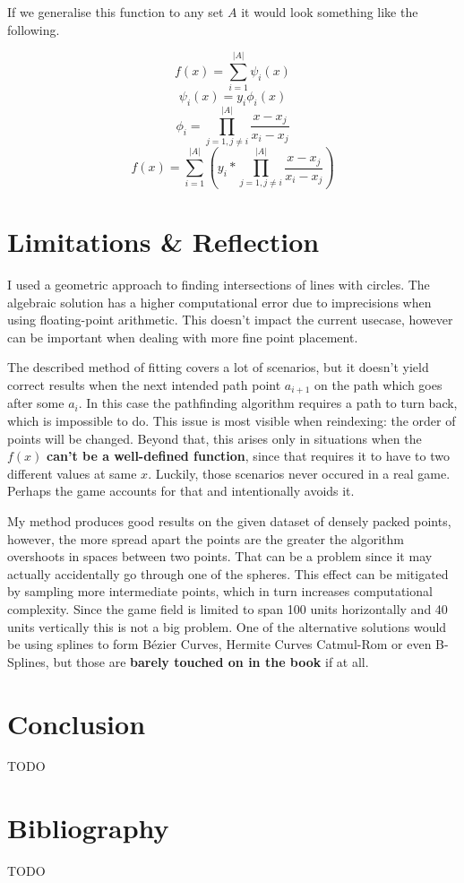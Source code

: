 \documentclass[12pt, titlepage]{article}
\newcommand{\TODO}{\begin{center}\color{red}TODO\end{center}}
\begin{document}
If we generalise this function to any set $A$ it would look something 
like the following.

$$f(x) = \sum_{i=1}^{|A|}\psi_i(x)$$
$$\psi_i(x) = y_i \phi_i(x)$$
\begin{equation}
    \phi_i = \prod_{j=1, j \neq i}^{|A|}\frac{x - x_j}{x_i - x_j}
\end{equation}
\begin{equation}
f(x) = \sum_{i=1}^{|A|} \left(y_i * \prod_{j=1, j \neq i}^{|A|} \frac{x - x_j}{x_i - x_j}\right)
\end{equation}

\section{Limitations \& Reflection}
I used a geometric approach to finding intersections of lines with circles.
The algebraic solution has a higher computational error due to imprecisions 
when using floating-point arithmetic. This doesn't impact the current usecase,
however can be important when dealing with more fine point placement.

The described method of fitting covers a lot of scenarios, but it doesn't yield 
correct results
when the next intended path point $a_{i + 1}$ on the path which goes after 
some $a_i$. In this case the pathfinding algorithm requires a path to turn back,
which is impossible to do. This issue is most visible when reindexing: the order
of points will be changed. Beyond that, this arises only in situations when the 
$f(x)$ \textbf{can't be a well-defined function}, since that requires it to have to
two different values at same $x$. Luckily, those scenarios never occured in a 
real game. Perhaps the game accounts for that and intentionally avoids it.

My method produces good results on the given dataset of densely packed points,
however, the more spread apart the points are the greater the algorithm
overshoots in spaces between two points. That can be a problem since it may 
actually accidentally go through one of the spheres. This effect can be
mitigated by sampling more intermediate points, which in turn increases 
computational complexity. Since the game field is  limited to span 100 units
horizontally and 40 units vertically this is not a big problem. One of the
alternative solutions would be using splines to form B\'{e}zier Curves, 
Hermite Curves Catmul-Rom or even B-Splines, but those are \textbf{barely touched 
on in the book} if at all.

\section{Conclusion}
\TODO

\section{Bibliography}
\appendix
\TODO
\end{document}
